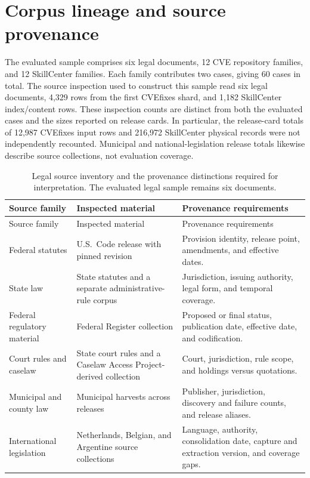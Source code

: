 \section{Corpus lineage and source provenance}
\label{app:corpus}
\setcounter{table}{0}
\renewcommand{\thetable}{\thesection.\arabic{table}}
\renewcommand{\theHtable}{\thesection.\arabic{table}}

The evaluated sample comprises six legal documents, 12 CVE repository families, and 12 SkillCenter families. Each family contributes two cases, giving 60 cases in total. The source inspection used to construct this sample read six legal documents, 4,329 rows from the first CVEfixes shard, and 1,182 SkillCenter index/content rows. These inspection counts are distinct from both the evaluated cases and the sizes reported on release cards. In particular, the release-card totals of 12,987 CVEfixes input rows and 216,972 SkillCenter physical records were not independently recounted. Municipal and national-legislation release totals likewise describe source collections, not evaluation coverage.

\begin{longtable}{@{}>{\raggedright\arraybackslash}p{.22\linewidth} >{\raggedright\arraybackslash}p{.34\linewidth} >{\raggedright\arraybackslash}p{.38\linewidth}@{}}
\caption{Legal source inventory and the provenance distinctions required for interpretation. The evaluated legal sample remains six documents.}\label{tab:A1}\\
\toprule
Source family & Inspected material & Provenance requirements \\
\midrule
\endfirsthead
\toprule
Source family & Inspected material & Provenance requirements \\
\midrule
\endhead
\bottomrule
\endlastfoot
Federal statutes & U.S.\ Code release with pinned revision & Provision identity, release point, amendments, and effective dates. \\[4pt]
State law & State statutes and a separate administrative-rule corpus & Jurisdiction, issuing authority, legal form, and temporal coverage. \\[4pt]
Federal regulatory material & Federal Register collection & Proposed or final status, publication date, effective date, and codification. \\[4pt]
Court rules and caselaw & State court rules and a Caselaw Access Project-derived collection & Court, jurisdiction, rule scope, and holdings versus quotations. \\[4pt]
Municipal and county law & Municipal harvests across releases & Publisher, jurisdiction, discovery and failure counts, and release aliases. \\[4pt]
International legislation & Netherlands, Belgian, and Argentine source collections & Language, authority, consolidation date, capture and extraction version, and coverage gaps. \\
\end{longtable}

